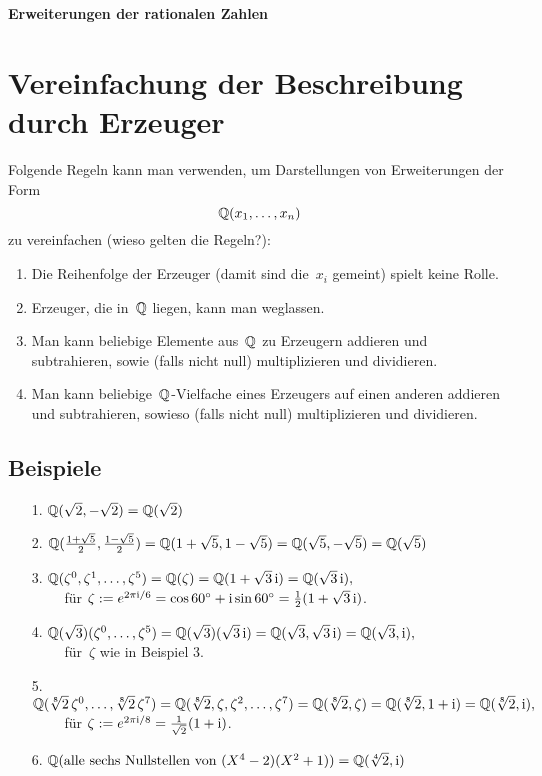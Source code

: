 \documentclass{../../algblatt}
\begin{document}
\begin{center}\huge \sffamily\textbf{Erweiterungen der rationalen Zahlen}\end{center}


\section*{Vereinfachung der Beschreibung durch Erzeuger}

Folgende Regeln kann man verwenden, um Darstellungen von Erweiterungen der
Form
\[ \mathbb{Q}(x_1,\ldots,x_n) \] zu vereinfachen (wieso gelten die Regeln?):
\begin{enumerate}
\item Die Reihenfolge der Erzeuger (damit sind die~$x_i$ gemeint) spielt keine Rolle.
\item Erzeuger, die in~$\mathbb{Q}$ liegen, kann man weglassen.
\item Man kann beliebige Elemente aus~$\mathbb{Q}$ zu Erzeugern addieren und
subtrahieren, sowie (falls nicht null) multiplizieren und dividieren.
\item Man kann beliebige~$\mathbb{Q}$-Vielfache eines Erzeugers auf einen anderen
addieren und subtrahieren, sowieso (falls nicht null) multiplizieren und
dividieren.
\end{enumerate}


\subsection*{Beispiele}

\begin{enumerate}
\item[1.] $\mathbb{Q}(\sqrt{2}, {-}\sqrt{2}) = \mathbb{Q}(\sqrt{2})$
\item[2.] $\mathbb{Q}(\frac{1 + \sqrt{5}}{2}, \frac{1 - \sqrt{5}}{2}) = \mathbb{Q}(1+\sqrt{5},
1-\sqrt{5}) = \mathbb{Q}(\sqrt{5},-\sqrt{5}) = \mathbb{Q}(\sqrt{5})$
\item[3.] $\mathbb{Q}(\zeta^0,\zeta^1,\ldots,\zeta^5) = \mathbb{Q}(\zeta) = \mathbb{Q}(1
+ \sqrt{3}\,\mathrm{i}) = \mathbb{Q}(\sqrt{3}\,\mathrm{i}),$ \\[0.3em]
${\qquad}$ für $\zeta := e^{2 \pi \mathrm{i}/6} = \cos 60^\circ + \mathrm{i} \sin 60^\circ =
\frac{1}{2}(1 + \sqrt{3}\,\mathrm{i})$.
\item[4.] $\mathbb{Q}(\sqrt{3})(\zeta^0,\ldots,\zeta^5) = \mathbb{Q}(\sqrt{3})(\sqrt{3}\,\mathrm{i}) =
\mathbb{Q}(\sqrt{3},\sqrt{3}\,\mathrm{i}) = \mathbb{Q}(\sqrt{3},\mathrm{i}),$ \\[0.3em]
${\qquad}$ für~$\zeta$ wie in Beispiel 3.
\item[5.]
$\mathbb{Q}(\sqrt[8]{2}\,\zeta^0, \ldots, \sqrt[8]{2}\,\zeta^7) = \mathbb{Q}(\sqrt[8]{2},
\zeta, \zeta^2, \ldots, \zeta^7) = \mathbb{Q}(\sqrt[8]{2}, \zeta) = \mathbb{Q}(\sqrt[8]{2}, 1 + \mathrm{i}) = \mathbb{Q}(\sqrt[8]{2},
\mathrm{i}),$ \\[0.3em]
${\qquad}$ für $\zeta := e^{2 \pi \mathrm{i}/8} = \frac{1}{\sqrt{2}}(1 + \mathrm{i})$.
\item[6.] $\mathbb{Q}(\text{alle sechs Nullstellen von~$(X^4 - 2) (X^2 + 1)$}) =
\mathbb{Q}(\sqrt[4]{2}, \mathrm{i})$
\end{enumerate}
\end{document}

